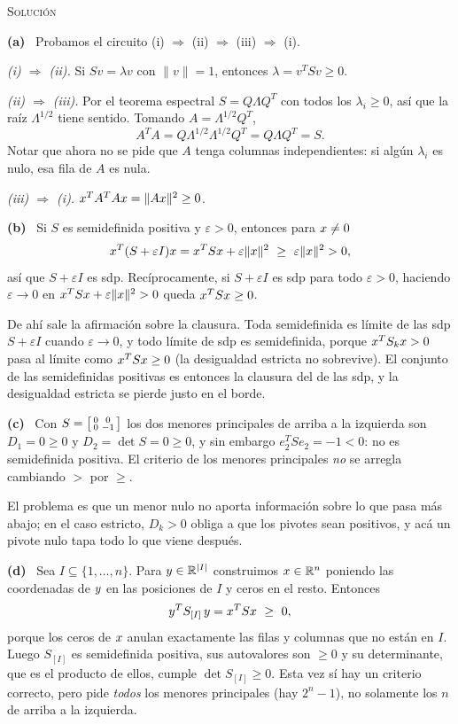 \documentclass[11pt,a4paper]{article}
\newcommand{\bi}[1]{\boldsymbol{#1}}
\newcommand{\n}[1]{\boldsymbol{#1}}
\newcommand{\R}{\mathbb{R}}
\DeclareMathOperator{\gen}{span}
\DeclareMathOperator{\tr}{tr}
\DeclareMathOperator{\rg}{rg}
\def\n#1{#1}\def\bi#1{#1}\def\rg{rg}\def\tr{tr}\def\gen{span}%
\newcommand{\solucion}{\par\medskip\noindent\textsc{Solución}\par\nobreak\smallskip\noindent}
\newcommand{\itemsol}[1]{\par\medskip\noindent\textbf{(#1)}\ \ignorespaces}
\begin{document}
\solucion
\itemsol{a} Probamos el circuito (i) $\Rightarrow$ (ii) $\Rightarrow$ (iii)
$\Rightarrow$ (i).

\emph{(i) $\Rightarrow$ (ii).} Si $S\n v=\lambda\n v$ con $\|\n v\|=1$, entonces
$\lambda=\n v^TS\n v\ge0$.

\emph{(ii) $\Rightarrow$ (iii).} Por el teorema espectral $S=Q\Lambda Q^T$ con
todos los $\lambda_i\ge0$, así que la raíz $\Lambda^{1/2}$ tiene sentido. Tomando
$A=\Lambda^{1/2}Q^T$,
\[
A^TA=Q\Lambda^{1/2}\Lambda^{1/2}Q^T=Q\Lambda Q^T=S .
\]
Notar que ahora no se pide que $A$ tenga columnas independientes: si algún
$\lambda_i$ es nulo, esa fila de $A$ es nula.

\emph{(iii) $\Rightarrow$ (i).} $\bx^TA^TA\bx=\|A\bx\|^2\ge0$.

\itemsol{b} Si $S$ es semidefinida positiva y $\varepsilon>0$, entonces para
$\bx\neq\n0$
\[
\bx^T(S+\varepsilon I)\bx=\bx^TS\bx+\varepsilon\|\bx\|^2
\ \ge\ \varepsilon\|\bx\|^2>0 ,
\]
así que $S+\varepsilon I$ es sdp. Recíprocamente, si $S+\varepsilon I$ es sdp
para todo $\varepsilon>0$, haciendo $\varepsilon\to0$ en
$\bx^TS\bx+\varepsilon\|\bx\|^2>0$ queda $\bx^TS\bx\ge0$.

De ahí sale la afirmación sobre la clausura. Toda semidefinida es límite de las
sdp $S+\varepsilon I$ cuando $\varepsilon\to0$, y todo límite de sdp es
semidefinida, porque $\bx^TS_k\bx>0$ pasa al límite como $\bx^TS\bx\ge0$ (la
desigualdad estricta no sobrevive). El conjunto de las semidefinidas positivas es
entonces la clausura del de las sdp, y la desigualdad estricta se pierde justo en
el borde.

\itemsol{c} Con $S=\begin{bsmallmatrix}0&0\\0&-1\end{bsmallmatrix}$ los dos
menores principales de arriba a la izquierda son $D_1=0\ge0$ y
$D_2=\det S=0\ge0$, y sin embargo $\bi{e}_2^TS\bi{e}_2=-1<0$: no es semidefinida
positiva. El criterio de los menores principales \emph{no} se arregla cambiando
$>$ por $\ge$.

El problema es que un menor nulo no aporta información sobre lo que pasa más
abajo; en el caso estricto, $D_k>0$ obliga a que los pivotes sean positivos, y
acá un pivote nulo tapa todo lo que viene después.

\itemsol{d} Sea $I\subseteq\{1,\dots,n\}$. Para $\by\in\R^{|I|}$ construimos
$\bx\in\R^n$ poniendo las coordenadas de $\by$ en las posiciones de $I$ y ceros
en el resto. Entonces
\[
\by^T S_{[I]}\,\by=\bx^TS\bx\ \ge\ 0 ,
\]
porque los ceros de $\bx$ anulan exactamente las filas y columnas que no están en
$I$. Luego $S_{[I]}$ es semidefinida positiva, sus autovalores son $\ge0$ y su
determinante, que es el producto de ellos, cumple $\det S_{[I]}\ge0$. Esta vez sí
hay un criterio correcto, pero pide \emph{todos} los menores principales (hay
$2^n-1$), no solamente los $n$ de arriba a la izquierda.
\end{document}
